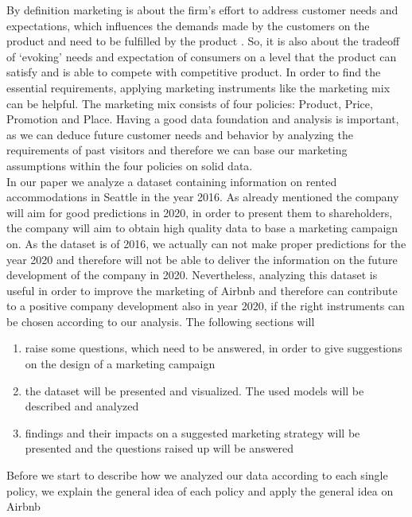 \documentclass[journal]{IEEEtran}
\begin{document}
By definition marketing is about the firm’s effort to address customer needs and expectations, which influences the demands made by the customers on the product and need to be fulfilled by the product \cite{Schierenbeck}. So, it is also about the tradeoff of ‘evoking’ needs and expectation of consumers on a level that the product can satisfy and is able to compete with competitive product. In order to find the essential requirements, applying marketing instruments like the marketing mix can be helpful. The marketing mix consists of four policies: Product, Price, Promotion and Place. Having a good data foundation and analysis is important, as we can deduce future customer needs and behavior by analyzing the requirements of past visitors and therefore we can base our marketing assumptions within the four policies on solid data.\\
In our paper we analyze a dataset containing information on rented accommodations in Seattle in the year 2016. As already mentioned the company will aim for good predictions in 2020, in order to present them to shareholders, the company will aim to obtain high quality data to base a marketing campaign on. As the dataset is of 2016, we actually can not make proper predictions for the year 2020 and therefore will not be able to deliver the information on the future development of the company in 2020. Nevertheless, analyzing this dataset is useful in order to improve the marketing of Airbnb and therefore can contribute to a positive company development also in year 2020, if the right instruments can be chosen according to our analysis. The following sections will 
\begin{enumerate}
\item raise some questions, which need to be answered, in order to give suggestions on the design of a marketing campaign
\item the dataset will be presented and visualized. The used models will be described and analyzed
\item findings and their impacts on a suggested marketing strategy will be presented and the questions raised up will be answered\\
\end{enumerate} 

\noindent Before we start to describe how we analyzed our data according to each single policy, we explain the general idea of each policy and apply the general idea on Airbnb
\end{document}
